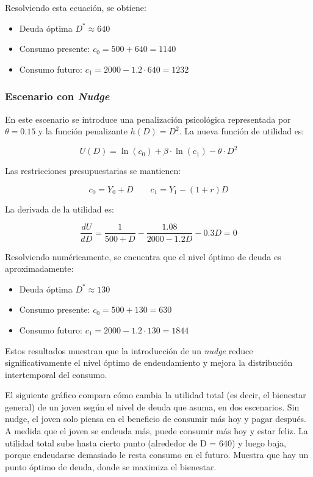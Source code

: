 \documentclass[10pt]{article}
\begin{document}
\begin{multicols}{2}
Resolviendo esta ecuación, se obtiene:

\begin{itemize}
    \item Deuda óptima $D^* \approx 640$
    \item Consumo presente: $c_0 = 500 + 640 = 1140$
    \item Consumo futuro: $c_1 = 2000 - 1.2 \cdot 640 = 1232$
\end{itemize}

\subsubsection*{Escenario con \textit{Nudge}}

En este escenario se introduce una penalización psicológica representada por $\theta = 0.15$ y la función penalizante $h(D) = D^2$. La nueva función de utilidad es:

\[
U(D) = \ln(c_0) + \beta \cdot \ln(c_1) - \theta \cdot D^2
\]

Las restricciones presupuestarias se mantienen:

\[
c_0 = Y_0 + D \qquad c_1 = Y_1 - (1 + r)D
\]

La derivada de la utilidad es:

\[
\frac{dU}{dD} = \frac{1}{500 + D} - \frac{1.08}{2000 - 1.2D} - 0.3D = 0
\]

Resolviendo numéricamente, se encuentra que el nivel óptimo de deuda es aproximadamente:

\begin{itemize}
    \item Deuda óptima $D^* \approx 130$
    \item Consumo presente: $c_0 = 500 + 130 = 630$
    \item Consumo futuro: $c_1 = 2000 - 1.2 \cdot 130 = 1844$
\end{itemize}

\medskip
Estos resultados muestran que la introducción de un \textit{nudge} reduce significativamente el nivel óptimo de endeudamiento y mejora la distribución intertemporal del consumo.

El siguiente gráfico compara cómo cambia la utilidad total (es decir, el bienestar general) de un joven según el nivel de deuda que asuma, en dos escenarios. Sin nudge, el joven solo piensa en el beneficio de consumir más hoy y pagar después. A medida que el joven se endeuda más, puede consumir más hoy y estar feliz. La utilidad total sube hasta cierto punto (alrededor de D = 640) y luego baja, porque endeudarse demasiado le resta consumo en el futuro. Muestra que hay un punto óptimo de deuda, donde se maximiza el bienestar.


\end{multicols}
\end{document}
